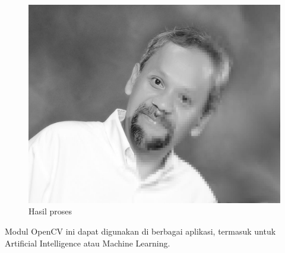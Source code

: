 \begin{figure}
\includegraphics[width=1.0\linewidth]{graphics/br-pixel-grey.png}
\caption{Hasil proses}
\end{figure}

Modul OpenCV ini dapat digunakan di berbagai aplikasi, termasuk untuk
Artificial Intelligence atau Machine Learning.
